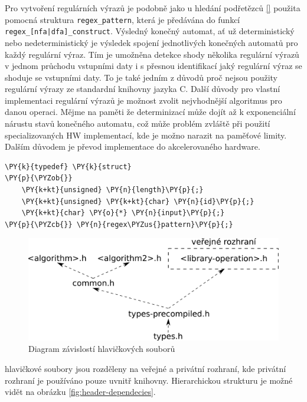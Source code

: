 Pro vytvoření regulárních výrazů je podobně jako u hledání podřetězců \ref{}
použita pomocná struktura \texttt{regex\_pattern}, která je předávána do funkcí \texttt{regex\_[nfa|dfa]\_construct}.
Výsledný konečný automat, ať už deterministický nebo nedeterministický je výsledek spojení jednotlivých
konečných automatů pro každý regulární výraz. Tím je umožněna detekce shody několika
regulární výrazů v jednom průchodu vstupními daty i s přesnou identifikací jaký regulární
výraz se shoduje se vstupními daty. To je také jedním z důvodů proč nejsou použity regulární výrazy ze standardní
knihovny jazyka C.
Další důvody pro vlastní implementaci regulární výrazů je možnost zvolit nejvhodnější algoritmus pro danou operaci.
Mějme na paměti že determinizací může dojít až k exponenciální nárustu stavů konečného automatu, což může problém
zvláště při použití specializovaných HW implementací, kde je možno narazit na paměťové limity.
Dalším důvodem je převod implementace do akcelerovaného hardware.

\begin{Verbatim}[commandchars=\\\{\}]
\PY{k}{typedef} \PY{k}{struct}
\PY{p}{\PYZob{}}
	\PY{k+kt}{unsigned} \PY{n}{length}\PY{p}{;}
	\PY{k+kt}{unsigned} \PY{k+kt}{char} \PY{n}{id}\PY{p}{;}
	\PY{k+kt}{char} \PY{o}{*} \PY{n}{input}\PY{p}{;}
\PY{p}{\PYZcb{}} \PY{n}{regex\PYZus{}pattern}\PY{p}{;}
\end{Verbatim}

\begin{figure}[!htb]
	\centering
	\includegraphics[scale=.25]{fig/header-dependencies.pdf}
	\caption{Diagram závislostí hlavičkových souborů}
\end{figure}\label{fig:header-dependecies}

hlavičkové soubory jsou rozděleny na veřejné a privátní rozhraní, kde privátní rozhraní je používáno pouze uvnitř knihovny. Hierarchickou strukturu je možné vidět na obrázku \ref{fig:header-dependecies}.

